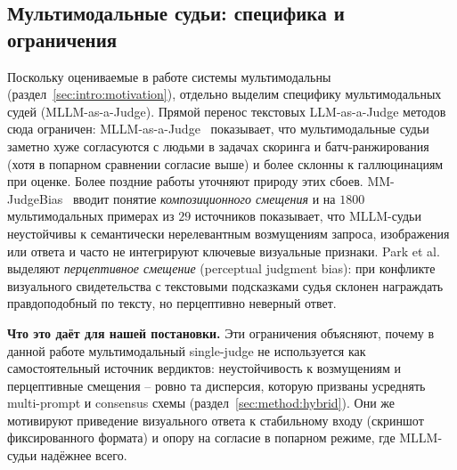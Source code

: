 \subsection{Мультимодальные судьи: специфика и ограничения}
\label{sec:related:mllm-judge}

Поскольку оцениваемые в работе системы мультимодальны
(раздел~\ref{sec:intro:motivation}), отдельно выделим специфику
мультимодальных судей (MLLM-as-a-Judge).
Прямой перенос текстовых LLM-as-a-Judge методов сюда ограничен:
MLLM-as-a-Judge~\cite{chen2024mllmjudge} показывает, что мультимодальные
судьи заметно хуже согласуются с людьми в задачах скоринга и батч-ранжи\-ро\-вания
(хотя в попарном сравнении согласие выше) и более склонны к
галлюцинациям при оценке.
Более поздние работы уточняют природу этих сбоев.
MM-JudgeBias~\cite{lee2026mmjudgebias} вводит понятие \emph{композиционного
смещения} и на $1800$ мультимодальных примерах из $29$ источников
показывает, что MLLM-судьи неустойчивы к семантически нерелевантным
возмущениям запроса, изображения или ответа и часто не интегрируют
ключевые визуальные признаки.
Park et al.~\cite{park2026perceptual} выделяют \emph{перцептивное
смещение} (perceptual judgment bias): при конфликте визуального
свидетельства с текстовыми подсказками судья склонен награждать
правдоподобный по тексту, но перцептивно неверный ответ.

\textbf{Что это даёт для нашей постановки.}
Эти ограничения объясняют, почему в данной работе мультимодальный
single-judge не используется как самостоятельный источник вердиктов:
неустойчивость к возмущениям и перцептивные смещения -- ровно та
дисперсия, которую призваны усреднять multi-prompt и consensus схемы
(раздел~\ref{sec:method:hybrid}).
Они же мотивируют приведение визуального ответа к стабильному входу
(скриншот фиксированного формата) и опору на согласие в попарном режиме,
где MLLM-судьи надёжнее всего.

